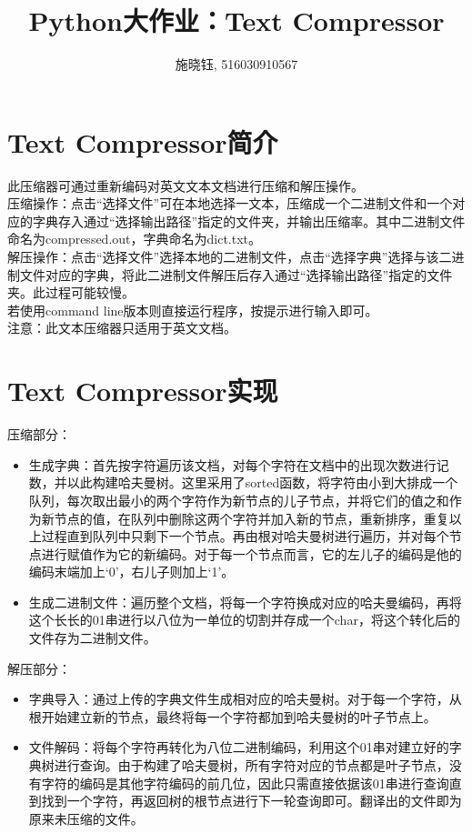 \documentclass[UTF8]{ctexart}
\title{Python大作业：Text Compressor}
\author{
{\small 施晓钰, 516030910567}
}
\begin{document}
\maketitle

\section{Text Compressor简介}
此压缩器可通过重新编码对英文文本文档进行压缩和解压操作。\\
\indent 压缩操作：点击“选择文件”可在本地选择一文本，压缩成一个二进制文件和一个对应的字典存入通过“选择输出路径”指定的文件夹，并输出压缩率。其中二进制文件命名为compressed.out，字典命名为dict.txt。\\
\indent 解压操作：点击“选择文件”选择本地的二进制文件，点击“选择字典”选择与该二进制文件对应的字典，将此二进制文件解压后存入通过“选择输出路径”指定的文件夹。此过程可能较慢。\\
\indent 若使用command line版本则直接运行程序，按提示进行输入即可。\\
\indent 注意：此文本压缩器只适用于英文文档。

\section{Text Compressor实现}
压缩部分：
\begin{itemize}
\item 生成字典：首先按字符遍历该文档，对每个字符在文档中的出现次数进行记数，并以此构建哈夫曼树。这里采用了sorted函数，将字符由小到大排成一个队列，每次取出最小的两个字符作为新节点的儿子节点，并将它们的值之和作为新节点的值，在队列中删除这两个字符并加入新的节点，重新排序，重复以上过程直到队列中只剩下一个节点。再由根对哈夫曼树进行遍历，并对每个节点进行赋值作为它的新编码。对于每一个节点而言，它的左儿子的编码是他的编码末端加上‘0’，右儿子则加上‘1’。
\item 生成二进制文件：遍历整个文档，将每一个字符换成对应的哈夫曼编码，再将这个长长的01串进行以八位为一单位的切割并存成一个char，将这个转化后的文件存为二进制文件。
\end{itemize}

\indent 解压部分：

\begin{itemize}
\item 字典导入：通过上传的字典文件生成相对应的哈夫曼树。对于每一个字符，从根开始建立新的节点，最终将每一个字符都加到哈夫曼树的叶子节点上。\\
\item 文件解码：将每个字符再转化为八位二进制编码，利用这个01串对建立好的字典树进行查询。由于构建了哈夫曼树，所有字符对应的节点都是叶子节点，没有字符的编码是其他字符编码的前几位，因此只需直接依据该01串进行查询直到找到一个字符，再返回树的根节点进行下一轮查询即可。翻译出的文件即为原来未压缩的文件。
\end{itemize}
\end{document}
